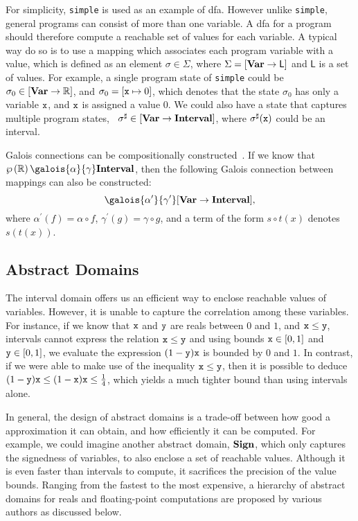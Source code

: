For simplicity, \verb|simple| is used as an example of \gls{dfa}\@.  However
unlike \verb|simple|, general programs can consist of more than one variable.
A \gls{dfa} for a program should therefore compute a reachable set of values
for each variable.  A typical way do so is to use a mapping which associates
each program variable with a value, which is defined as an element $\sigma \in
\Sigma$, where $\Sigma = \left[\mathbf{Var} \to \mathsf{L}\right]$ and $\mathsf{L}$
is a set of values.  For example, a single program state of \verb|simple|
could be $\sigma_0 \in \left[\mathbf{Var} \to \mathbb{R}\right]$, and $\sigma_0 =
[\texttt{x} \mapsto 0]$, which denotes that the state $\sigma_0$ has only a variable
$\texttt{x}$, and $\texttt{x}$ is assigned a value $0$.  We could also have a state that
captures multiple program states, \eg~$\sigma^\sharp \in \left[\mathbf{Var} \to
\mathbf{Interval}\right]$, where $\sigma^\sharp(\texttt{x})$ could be an interval.

Galois connections can be compositionally constructed~\cite{nielson99}.  If
we know that $\powersetof\realset \galois{\alpha}{\gamma} \intervalset$, then
the following Galois connection between mappings can also be constructed:
\begin{equation}
    [\varset \to \powersetof\realset]
        \galois{\alpha^\prime}{\gamma^\prime}
    [\varset \to \intervalset],
\end{equation}
where $\alpha^\prime(f) = \alpha \circ f$, $\gamma^\prime(g) = \gamma \circ g$,
and a term of the form $s \circ t (x)$ denotes $s(t(x))$.


\subsection{Abstract Domains}
\label{bg:sub:abstract_domains}

The interval domain offers us an efficient way to enclose reachable values
of variables.  However, it is unable to capture the correlation among these
variables.  For instance, if we know that $\texttt{x}$ and $\texttt{y}$ are reals between
$0$ and $1$, and $\texttt{x} \leq \texttt{y}$, intervals cannot express the relation
$\texttt{x} \leq \texttt{y}$ and using bounds $\texttt{x} \in [0, 1]$ and $\texttt{y} \in [0, 1]$,
we evaluate the expression $(1 - \texttt{y})\texttt{x}$ is bounded by $0$ and $1$.  In
contrast, if we were able to make use of the inequality $\texttt{x} \leq \texttt{y}$,
then it is possible to deduce $(1 - \texttt{y}) \texttt{x} \leq (1 - \texttt{x}) \texttt{x} \leq
\frac{1}{4}$, which yields a much tighter bound than using intervals alone.

In general, the design of abstract domains is a trade-off between how good
a approximation it can obtain, and how efficiently it can be computed.  For
example, we could imagine another abstract domain, $\mathbf{Sign}$, which only
captures the signedness of variables, to also enclose a set of reachable
values.  Although it is even faster than intervals to compute, it sacrifices
the precision of the value bounds.  Ranging from the fastest to the most
expensive, a hierarchy of abstract domains for reals and floating-point
computations are proposed by various authors as discussed below.

